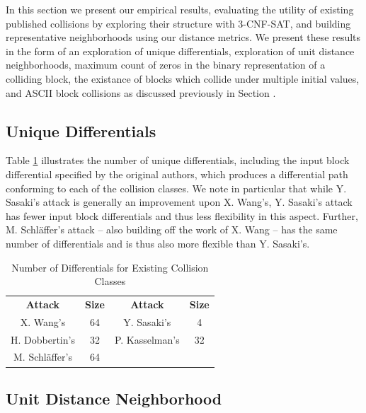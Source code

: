 \documentclass[conference]{IEEEtran}
\begin{document}
In this section we present our empirical results, evaluating the
utility of existing published collisions by exploring their structure
with 3-CNF-SAT, and building representative neighborhoods using our
distance metrics.  We present these results in the form of an
exploration of unique differentials, exploration of unit distance
neighborhoods, maximum count of zeros in the binary representation of
a colliding block, the existance of blocks which collide under
multiple initial values, and ASCII block collisions as discussed
previously in Section \label{Sec:Intuition}.

\subsection{Unique Differentials} \label{empirical:differentials}

Table \ref{table:differentials} illustrates the number of unique differentials,
including the input block differential specified by the original authors, which produces a differential path conforming to
each of the collision classes. We note in particular that while Y. Sasaki's
attack is generally an improvement upon X. Wang's, Y. Sasaki's attack has fewer
input block differentials and thus less flexibility in this aspect. Further,
M. Schl{\"a}ffer's attack -- also building off the work of X. Wang -- has the
same number of differentials and is thus also more flexible than Y. Sasaki's.

\begin{table}
    \caption{Number of Differentials for Existing Collision Classes}
    \label{table:differentials}
    \begin{tabular}{c c c c}
        \textbf{Attack} & \textbf{Size} & \textbf{Attack} & \textbf{Size} \\
        X. Wang's & 64 & Y. Sasaki's & 4 \\
        H. Dobbertin's & 32 & P. Kasselman's & 32 \\
        M. Schl{\"a}ffer's & 64 & & \\
    \end{tabular}
\end{table}

\subsection{Unit Distance Neighborhood} \label{empirical:neighborhood}
\end{document}
